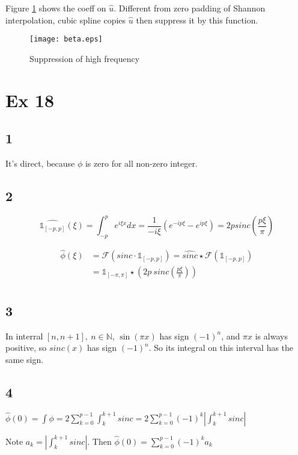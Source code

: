 \documentclass{article}
\begin{document}
	Figure \ref{fig:beta} shows the coeff on $\hat{u}$. Different from zero padding of Shannon interpolation, cubic spline copies $\hat{u}$ then suppress it by this function.
	
	\begin{figure}
		\centering
		\texttt{[image: beta.eps]}
		\caption{Suppression of high frequency}
		\label{fig:beta}
	\end{figure}

	\section*{Ex 18}
	\subsection*{1}
	It's direct, because $\phi$ is zero for all non-zero integer.
	\subsection*{2}
	\begin{equation*}
	\widehat{\mathbb{1}_{[-p,p]}}(\xi) = \int_{-p}^p e^{i\xi x} dx = \frac{1}{-i\xi} (e^{-ip\xi}-e^{ip\xi}) = 2p sinc(\frac{p\xi}{\pi})
	\end{equation*}
	
	\begin{equation*}
	\begin{split}
	\hat{\phi}(\xi) &= \mathscr{F}(sinc \cdot \mathbb{1}_{[-p,p]}) =\widehat{sinc}\star \mathscr{F}(\mathbb{1}_{[-p,p]})\\
	&= \mathbb{1}_{[-\pi,\pi]} \star (2p\ sinc(\frac{p\xi}{\pi}))\\
	\end{split}
	\end{equation*}
	\subsection*{3}
	In interral $[n,n+1],\ n\in \mathbb{N}$, $\sin(\pi x)$ has sign $(-1)^n$, and $\pi x$ is always positive, so $sinc(x)$ has sign $(-1)^n$. So its integral on this interval has the same sign.
	\subsection*{4}
	$\hat{\phi}(0) = \int \phi = 2 \sum_{k = 0}^{p-1} \int_k^{k+1} sinc = 2 \sum_{k = 0}^{p-1} (-1)^k|\int_k^{k+1} sinc|$
	
	Note $a_k = |\int_k^{k+1} sinc|$. Then $\hat{\phi}(0) = \sum_{k=0}^{p-1} (-1)^k a_k$
	
\end{document}
